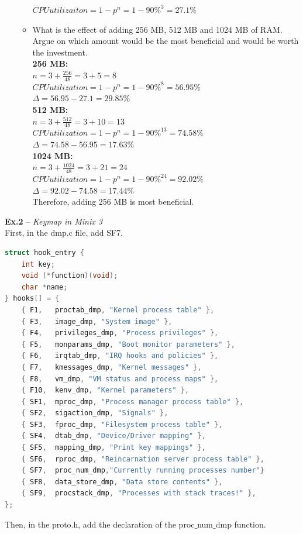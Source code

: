 \documentclass{article}
\begin{document}
\begin{spacing}{2.0}
\begin{enumerate}
\begin{itemize}
    $CPU utilizaiton=1-p^n=1-90\%^3=27.1\%$
    \item What is the effect of adding 256 MB, 512 MB and 1024 MB of RAM. Argue on which amount would be the most beneficial and would be worth the investment.\\
    \textbf{256 MB:}\\
    $n=3+\frac{256}{48}=3+5=8$\\
    $CPU utilization=1-p^n=1-90\%^8=56.95\%$\\
    $\Delta=56.95-27.1=29.85\%$\\
    \textbf{512 MB:}\\
    $n=3+\frac{512}{48}=3+10=13$\\
    $CPU utilization=1-p^n=1-90\%^13=74.58\%$\\
    $\Delta=74.58-56.95=17.63\%$\\
    \textbf{1024 MB:}\\
    $n=3+\frac{1024}{48}=3+21=24$\\
    $CPU utilization=1-p^n=1-90\%^{24}=92.02\%$\\
    $\Delta=92.02-74.58=17.44\%$\\
    Therefore, adding 256 MB is most beneficial.
\end{itemize}
\end{enumerate}
\noindent\textbf{Ex.2} -- \textit{Keymap in Minix 3}\\
First, in the dmp.c file, add SF7.
\begin{lstlisting}[language=c++]
struct hook_entry {
    int key;
    void (*function)(void);
    char *name;
} hooks[] = {
    { F1,   proctab_dmp, "Kernel process table" },
    { F3,   image_dmp, "System image" },
    { F4,   privileges_dmp, "Process privileges" },
    { F5,   monparams_dmp, "Boot monitor parameters" },
    { F6,   irqtab_dmp, "IRQ hooks and policies" },
    { F7,   kmessages_dmp, "Kernel messages" },
    { F8,   vm_dmp, "VM status and process maps" },
    { F10,  kenv_dmp, "Kernel parameters" },
    { SF1,  mproc_dmp, "Process manager process table" },
    { SF2,  sigaction_dmp, "Signals" },
    { SF3,  fproc_dmp, "Filesystem process table" },
    { SF4,  dtab_dmp, "Device/Driver mapping" },
    { SF5,  mapping_dmp, "Print key mappings" },
    { SF6,  rproc_dmp, "Reincarnation server process table" },
    { SF7,  proc_num_dmp,"Currently running processes number"}
    { SF8,  data_store_dmp, "Data store contents" },
    { SF9,  procstack_dmp, "Processes with stack traces!" },
};
\end{lstlisting}
Then, in the proto.h, add the declaration of the proc$\_$num$\_$dmp function.

\end{spacing}
\end{document}
